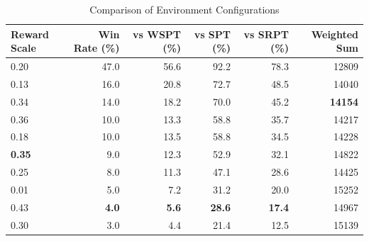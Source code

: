 \begin{table}[htbp]%
\centering%
\begin{tabular}{lrrrrr}%
\toprule%
\textbf{Reward Scale}&\textbf{Win Rate (\%)}&\textbf{vs WSPT (\%)}&\textbf{vs SPT (\%)}&\textbf{vs SRPT (\%)}&\textbf{Weighted Sum}\\%
\midrule%
0.20&47.0&56.6&92.2&78.3&12809\\%
0.13&16.0&20.8&72.7&48.5&14040\\%
0.34&14.0&18.2&70.0&45.2&\textbf{14154}\\%
0.36&10.0&13.3&58.8&35.7&14217\\%
0.18&10.0&13.5&58.8&34.5&14228\\%
\textbf{0.35}&9.0&12.3&52.9&32.1&14822\\%
0.25&8.0&11.3&47.1&28.6&14425\\%
0.01&5.0&7.2&31.2&20.0&15252\\%
0.43&\textbf{4.0}&\textbf{5.6}&\textbf{28.6}&\textbf{17.4}&14967\\%
0.30&3.0&4.4&21.4&12.5&15139\\%
\bottomrule%
\end{tabular}%
\caption{Comparison of Environment Configurations}%
\label{tab:environment}%
\end{table}